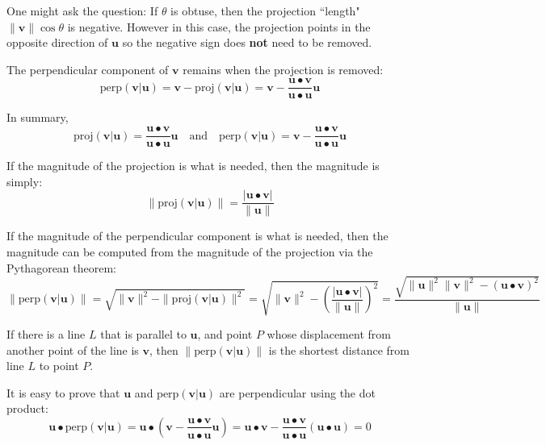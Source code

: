 \documentclass{article}
\begin{document}
One might ask the question: If \(\theta\) is obtuse, then the projection ``length" \(\|\mathbf{v}\|\cos\theta\) is negative. However in this case, the projection points in the opposite direction of \(\mathbf{u}\) so the negative sign does {\bf not} need to be removed.

The perpendicular component of \(\mathbf{v}\) remains when the projection is removed:
\[\text{perp}(\mathbf{v}|\mathbf{u}) = \mathbf{v} - \text{proj}(\mathbf{v}|\mathbf{u}) = \mathbf{v} - \frac{\mathbf{u} \bullet \mathbf{v}}{\mathbf{u} \bullet \mathbf{u}}\mathbf{u}\]

In summary, 
\[\text{proj}(\mathbf{v}|\mathbf{u}) = \frac{\mathbf{u} \bullet \mathbf{v}}{\mathbf{u} \bullet \mathbf{u}}\mathbf{u} \quad\text{and}\quad \text{perp}(\mathbf{v}|\mathbf{u}) = \mathbf{v} - \frac{\mathbf{u} \bullet \mathbf{v}}{\mathbf{u} \bullet \mathbf{u}}\mathbf{u}\]

If the magnitude of the projection is what is needed, then the magnitude is simply:
\[\|\text{proj}(\mathbf{v}|\mathbf{u})\| = \frac{|\mathbf{u} \bullet \mathbf{v}|}{\|\mathbf{u}\|}\]

If the magnitude of the perpendicular component is what is needed, then the magnitude can be computed from the magnitude of the projection via the Pythagorean theorem:
\[\|\text{perp}(\mathbf{v}|\mathbf{u})\| 
= \sqrt{\|\mathbf{v}\|^2 - \|\text{proj}(\mathbf{v}|\mathbf{u})\|^2} 
= \sqrt{\|\mathbf{v}\|^2 - \left(\frac{|\mathbf{u} \bullet \mathbf{v}|}{\|\mathbf{u}\|}\right)^2}
= \frac{\sqrt{\|\mathbf{u}\|^2\|\mathbf{v}\|^2 - (\mathbf{u} \bullet \mathbf{v})^2}}{\|\mathbf{u}\|}\]

If there is a line \(L\) that is parallel to \(\mathbf{u}\), and point \(P\) whose displacement from another point of the line is \(\mathbf{v}\), then \(\|\text{perp}(\mathbf{v}|\mathbf{u})\|\) is the shortest distance from line \(L\) to point \(P\).

It is easy to prove that \(\mathbf{u}\) and \(\text{perp}(\mathbf{v}|\mathbf{u})\) are perpendicular using the dot product: 
\[\mathbf{u} \bullet \text{perp}(\mathbf{v}|\mathbf{u}) = 
\mathbf{u} \bullet \left(\mathbf{v} - \frac{\mathbf{u} \bullet \mathbf{v}}{\mathbf{u} \bullet \mathbf{u}}\mathbf{u}\right) = 
\mathbf{u} \bullet \mathbf{v} - \frac{\mathbf{u} \bullet \mathbf{v}}{\mathbf{u} \bullet \mathbf{u}}(\mathbf{u} \bullet \mathbf{u}) = 
0\]
\end{document}
